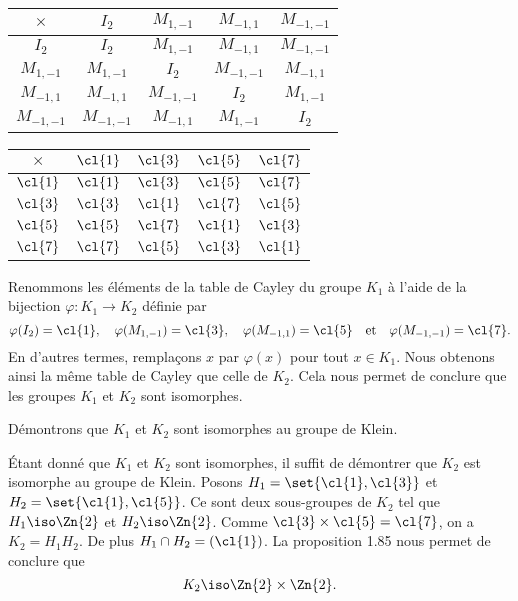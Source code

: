 \begin{enumerate}
    \begin{center}
      \begin{tabular}{c|cccc}
        $\times$    & $I_2$       & $M_{1,-1}$  & $M_{-1,1}$  & $M_{-1,-1}$ \\
        \midrule
        $I_2$       & $I_2$       & $M_{1,-1}$  & $M_{-1,1}$  & $M_{-1,-1}$ \\
        $M_{1,-1}$  & $M_{1,-1}$  & $I_2$       & $M_{-1,-1}$ & $M_{-1,1}$  \\
        $M_{-1,1}$  & $M_{-1,1}$  & $M_{-1,-1}$ & $I_2$       & $M_{1,-1}$  \\
        $M_{-1,-1}$ & $M_{-1,-1}$ & $M_{-1,1}$  & $M_{1,-1}$  & $I_2$
      \end{tabular}
    \end{center}
    \begin{center}
      \begin{tabular}{c|cccc}
        $\times$ & $\cl{1}$ & $\cl{3}$ & $\cl{5}$ & $\cl{7}$ \\
        \midrule
        $\cl{1}$ & $\cl{1}$ & $\cl{3}$ & $\cl{5}$ & $\cl{7}$ \\
        $\cl{3}$ & $\cl{3}$ & $\cl{1}$ & $\cl{7}$ & $\cl{5}$ \\
        $\cl{5}$ & $\cl{5}$ & $\cl{7}$ & $\cl{1}$ & $\cl{3}$ \\
        $\cl{7}$ & $\cl{7}$ & $\cl{5}$ & $\cl{3}$ & $\cl{1}$
      \end{tabular}
    \end{center}

    Renommons les éléments de la table de Cayley du groupe $K_1$ à l'aide de la
    bijection $\varphi\colon K_1\to K_2$ définie par
    \[
      \varphi(I_2) = \cl{1},\quad 
      \varphi(M_{1,-1}) = \cl{3}, \quad
      \varphi(M_{-1,1}) = \cl{5} \quad\text{et}\quad
      \varphi(M_{-1,-1}) = \cl{7}.
    \]
    En d'autres termes, remplaçons $x$ par $\varphi(x)$ pour tout $x\in K_1$.
    Nous obtenons ainsi la même table de Cayley que celle de $K_2$. Cela nous
    permet de conclure que les groupes $K_1$ et $K_2$ sont isomorphes.

    Démontrons que $K_1$ et $K_2$ sont isomorphes au groupe de Klein.

    Étant donné que $K_1$ et $K_2$ sont isomorphes, il suffit de démontrer que
    $K_2$ est isomorphe au groupe de Klein.  Posons $H_1 = \set{\cl{1},\cl{3}}$
    et $H_2 = \set{\cl{1},\cl{5}}$. Ce sont deux sous-groupes de $K_2$ tel que
    $H_1\iso\Zn{2}$ et $H_2\iso\Zn{2}$.  Comme
    $\cl{3}\times\cl{5}=\cl{7}$, on a $K_2 = H_1H_2$. 
    De plus $H_1\cap H_2 = (\cl{1})$. La proposition 1.85 nous permet de
    conclure que
    \[
      K_2\iso\Zn{2}\times\Zn{2}.
    \]
\end{enumerate}
